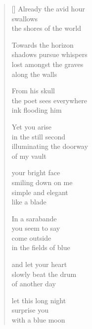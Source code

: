 \documentclass[12pt,a4paper]{article}
\begin{document}

\newpage

\poemtitle{}

\settowidth{\versewidth}{Yet you arise in the still second}

\bigskip

\begin{verse}[\versewidth]
  Already the avid hour \\
  swallows \\
  the shores of the world

  Towards the horizon \\
  shadows pursue whispers \\
  lost amongst the graves \\
  along the walls

  From his skull \\
  the poet sees everywhere \\
  ink flooding him

  Yet you arise \\
  in the still second \\
  illuminating the doorway \\
  of my vault

  your bright face \\
  smiling down on me \\
  simple and elegant \\
  like a blade

  In a sarabande \\
  you seem to say \\
  come outside \\
  in the fields of blue

  and let your heart \\
  slowly beat the drum \\
  of another day

  let this long night \\
  surprise you \\
  with a blue moon
\end{verse}


\newpage

\poemtitle{}

\settowidth{\versewidth}{my lips still reach for the heavens}

\bigskip
\end{document}
